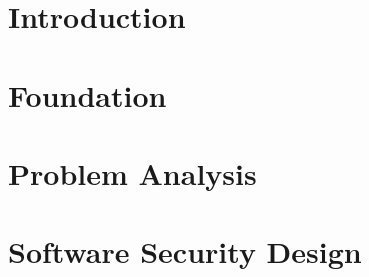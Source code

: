 \documentclass[12pt]{report}
\begin{document}
\tableofcontents

\chapter{Introduction}





\chapter{\centeringTheoretical Foundation}\label{chap:2}






\chapter{Problem Analysis}\label{chap:3}


\chapter{Software Security Design}
% 
% 
% 




\printbibliography
\end{document}
